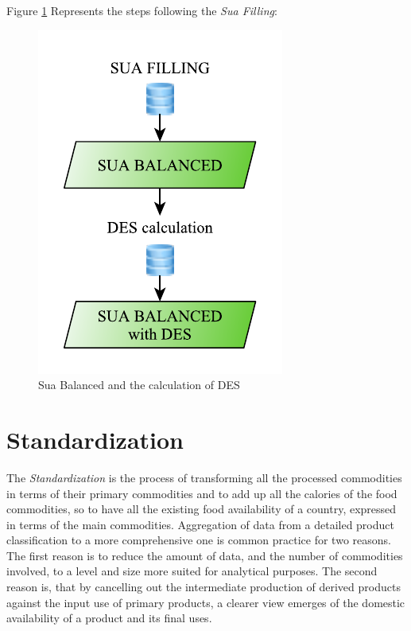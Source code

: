 \documentclass[]{article}
\begin{document}
Figure \ref{fig:f8} Represents the steps following the \emph{Sua
Filling}:

\begin{figure}[H]

{\centering \includegraphics{images/08_SuaBalanced} 

}

\caption{\label{fig:f8}Sua Balanced and the calculation of DES}\label{fig:f8}
\end{figure}

\section{Standardization}\label{standardization}

The \emph{Standardization} is the process of transforming all the
processed commodities in terms of their primary commodities and to add
up all the calories of the food commodities, so to have all the existing
food availability of a country, expressed in terms of the main
commodities. Aggregation of data from a detailed product classification
to a more comprehensive one is common practice for two reasons. The
first reason is to reduce the amount of data, and the number of
commodities involved, to a level and size more suited for analytical
purposes. The second reason is, that by cancelling out the intermediate
production of derived products against the input use of primary
products, a clearer view emerges of the domestic availability of a
product and its final uses.
\end{document}
